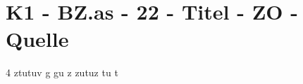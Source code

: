 \section{K1 - BZ.as - 22 - Titel - ZO - Quelle}

\begin{langesbeispiel}\item[4] %
ztutuv g gu z zutuz tu t

\end{langesbeispiel}